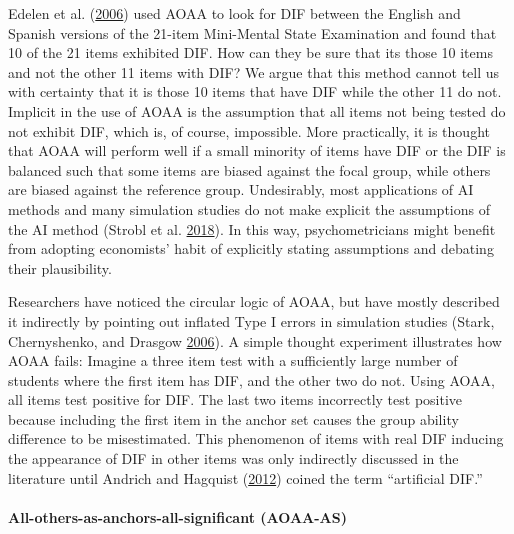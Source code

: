 \documentclass[
  11pt,
]{article}
\begin{document}
Edelen et al. (\protect\hyperlink{ref-edelen2006identification}{2006}) used AOAA to look for DIF between the English and Spanish versions of the 21-item Mini-Mental State Examination and found that 10 of the 21 items exhibited DIF. How can they be sure that its those 10 items and not the other 11 items with DIF? We argue that this method cannot tell us with certainty that it is those 10 items that have DIF while the other 11 do not. Implicit in the use of AOAA is the assumption that all items not being tested do not exhibit DIF, which is, of course, impossible. More practically, it is thought that AOAA will perform well if a small minority of items have DIF or the DIF is balanced such that some items are biased against the focal group, while others are biased against the reference group. Undesirably, most applications of AI methods and many simulation studies do not make explicit the assumptions of the AI method (Strobl et al. \protect\hyperlink{ref-strobl2018anchor}{2018}). In this way, psychometricians might benefit from adopting economists' habit of explicitly stating assumptions and debating their plausibility.

Researchers have noticed the circular logic of AOAA, but have mostly described it indirectly by pointing out inflated Type I errors in simulation studies (Stark, Chernyshenko, and Drasgow \protect\hyperlink{ref-stark2006detecting}{2006}). A simple thought experiment illustrates how AOAA fails: Imagine a three item test with a sufficiently large number of students where the first item has DIF, and the other two do not. Using AOAA, all items test positive for DIF. The last two items incorrectly test positive because including the first item in the anchor set causes the group ability difference to be misestimated. This phenomenon of items with real DIF inducing the appearance of DIF in other items was only indirectly discussed in the literature until Andrich and Hagquist (\protect\hyperlink{ref-andrich2012real}{2012}) coined the term \enquote{artificial DIF.}

\hypertarget{all-others-as-anchors-all-significant-aoaa-as}{%
\paragraph{All-others-as-anchors-all-significant (AOAA-AS)}\label{all-others-as-anchors-all-significant-aoaa-as}}
\end{document}
